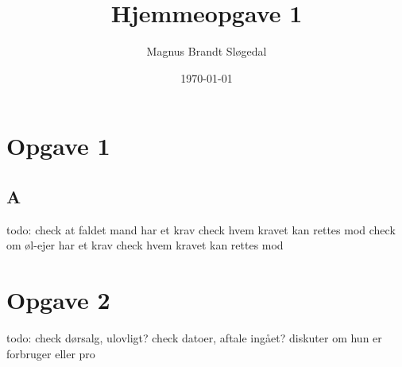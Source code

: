 \documentclass[11pt, a4paper]{article}
\title{Hjemmeopgave 1}
\author{Magnus Brandt Sløgedal}
\date{\today}
\begin{document}
\maketitle
\section{Opgave 1}
\subsection*{A}
todo:
check at faldet mand har et krav
check hvem kravet kan rettes mod
check om øl-ejer har et krav
check hvem kravet kan rettes mod

\section{Opgave 2}
todo:
check dørsalg, ulovligt?
check datoer, aftale ingået?
diskuter om hun er forbruger eller pro
\end{document}
